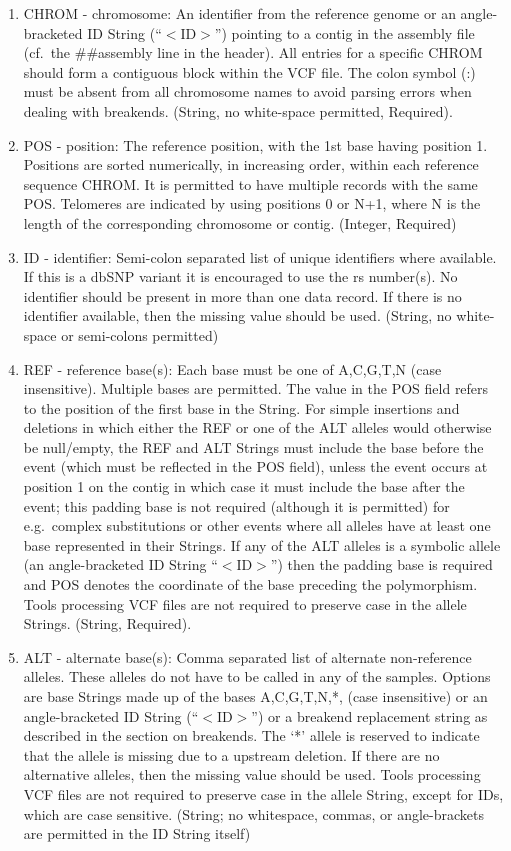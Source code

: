 \documentclass[8pt]{article}
\begin{document}
\begin{enumerate}
  \item CHROM - chromosome: An identifier from the reference genome or an angle-bracketed ID String (``$<$ID$>$'') pointing to a contig in the assembly file (cf.\ the \#\#assembly line in the header). All entries for a specific CHROM should form a contiguous block within the VCF file. The colon symbol (:) must be absent from all chromosome names to avoid parsing errors when dealing with breakends. (String, no white-space permitted, Required).
  \item POS - position: The reference position, with the 1st base having position 1. Positions are sorted numerically, in increasing order, within each reference sequence CHROM.   It is permitted to have multiple records with the same POS. Telomeres are indicated by using positions 0 or N+1, where N is the length of the corresponding chromosome or contig.   (Integer, Required)
  \item ID - identifier: Semi-colon separated list of unique identifiers where available. If this is a dbSNP variant it is encouraged to use the rs number(s). No identifier should be present in more than one data record. If there is no identifier available, then the missing value should be used. (String, no white-space or semi-colons permitted)
  \item REF - reference base(s): Each base must be one of A,C,G,T,N (case insensitive). Multiple bases are permitted. The value in the POS field refers to the position of the first base in the String. For simple insertions and deletions in which either the REF or one of the ALT alleles would otherwise be null/empty, the REF and ALT Strings must include the base before the event (which must be reflected in the POS field), unless the event occurs at position 1 on the contig in which case it must include the base after the event; this padding base is not required (although it is permitted) for e.g.\ complex substitutions or other events where all alleles have at least one base represented in their Strings.  If any of the ALT alleles is a symbolic allele (an angle-bracketed ID String ``$<$ID$>$'') then the padding base is required and POS denotes the coordinate of the base preceding the polymorphism. Tools processing VCF files are not required to preserve case in the allele Strings. (String, Required).
  \item ALT - alternate base(s): Comma separated list of alternate non-reference alleles.  These alleles do not have to be called in any of the samples. Options are base Strings made up of the bases A,C,G,T,N,*, (case insensitive) or an angle-bracketed ID String (``$<$ID$>$'') or a breakend replacement string as described in the section on breakends. The `*' allele is reserved to indicate that the allele is missing due to a upstream deletion. If there are no alternative alleles, then the missing value should be used.  Tools processing VCF files are not required to preserve case in the allele String, except for IDs, which are case sensitive.  (String; no whitespace, commas, or angle-brackets are permitted in the ID String itself)

\end{enumerate}
\end{document}
